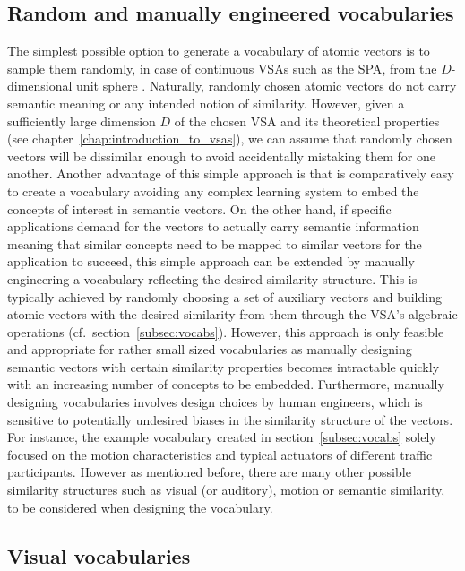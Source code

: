 \subsection{Random and manually engineered vocabularies}%
\label{subsec:basic_random_vocabularies}

The simplest possible option to generate a vocabulary of atomic vectors is to sample them randomly, in case of continuous \acp{VSA} such as the \ac{SPA}, from the $D$-dimensional unit sphere \cite{Voelker2017}.
Naturally, randomly chosen atomic vectors do not carry semantic meaning or any intended notion of similarity.
However, given a sufficiently large dimension $D$ of the chosen \ac{VSA} and its theoretical properties (see chapter~\ref{chap:introduction_to_vsas}), we can assume that randomly chosen vectors will be dissimilar enough to avoid accidentally mistaking them for one another.
Another advantage of this simple approach is that is comparatively easy to create a vocabulary avoiding any complex learning system to embed the concepts of interest in semantic vectors.
On the other hand, if specific applications demand for the vectors to actually carry semantic information meaning that similar concepts need to be mapped to similar vectors for the application to succeed, this simple approach can be extended by manually engineering a vocabulary reflecting the desired similarity structure.
This is typically achieved by randomly choosing a set of auxiliary vectors and building atomic vectors with the desired similarity from them through the \ac{VSA}'s algebraic operations (cf.\ section~\ref{subsec:vocabs}).
However, this approach is only feasible and appropriate for rather small sized vocabularies as manually designing semantic vectors with certain similarity properties becomes intractable quickly with an increasing number of concepts to be embedded.
Furthermore, manually designing vocabularies involves design choices by human engineers, which is sensitive to potentially undesired biases in the similarity structure of the vectors.
For instance, the example vocabulary created in section~\ref{subsec:vocabs} solely focused on the motion characteristics and typical actuators of different traffic participants.
However as mentioned before, there are many other possible similarity structures such as visual (or auditory), motion or semantic similarity, to be considered when designing the vocabulary.

\subsection{Visual vocabularies}%
\label{subsec:visual_vocabularies}

